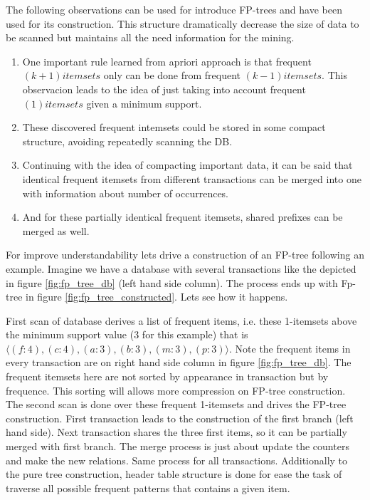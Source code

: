 The following observations can be used for introduce FP-trees and have been used
for its construction. This structure dramatically decrease the size of data to be 
scanned but maintains all the need information for the mining.

\begin{enumerate}[label=\roman*)]
  \item One important rule learned from apriori approach is that frequent
    $(k+1) itemsets$ only can be done from frequent $(k-1) itemsets$. This observacion
    leads to the idea of just taking into account frequent $(1) itemsets$ given a
    minimum support.
  \item These discovered frequent intemsets could be stored in some compact
    structure, avoiding repeatedly scanning the DB.
  \item Continuing with the idea of compacting important data, it can be said
    that identical frequent itemsets from different transactions can be merged
    into one with information about number of occurrences.
  \item And for these partially identical frequent itemsets, shared prefixes can
    be merged as well.
\end{enumerate}

For improve understandability lets drive a construction of an FP-tree following an
example. Imagine we have a database with several transactions like the depicted
in figure \ref{fig:fp_tree_db} (left hand side column). The process ends up with
Fp-tree in figure \ref{fig:fp_tree_constructed}. Lets see how it happens. 

First scan of database derives a list of frequent items, i.e. these 1-itemsets 
above the minimum support value (3 for this example) that is $\langle
(f:4),(c:4),(a:3),(b:3),(m:3),(p:3) \rangle$. Note the frequent items in every
transaction are on right hand side column in figure \ref{fig:fp_tree_db}. The
frequent itemsets here are not sorted by appearance in transaction but by
frequence. This sorting will allows more compression on FP-tree construction. The 
second scan is done over these frequent 1-itemsets and drives the
FP-tree construction. First transaction leads to the construction of the first
branch (left hand side). Next transaction shares the three first items, so
it can be partially merged with first branch. The merge process is just about
update the counters and make the new relations. Same process for all
transactions. Additionally to the pure tree construction, header table structure 
is done for ease the task of traverse all possible frequent patterns that 
contains a given item. 

